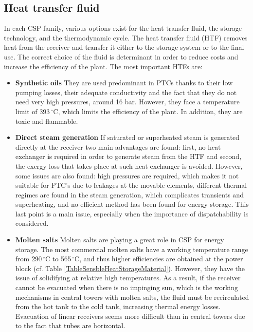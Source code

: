 \subsection{Heat transfer fluid} \label{subsection_HTF}
In each CSP family, various options exist for the heat transfer fluid, the storage technology, and the thermodynamic cycle. The heat transfer fluid (HTF) removes heat from the receiver and transfer it either to the storage system or to the final use. The correct choice of the fluid is determinant in order to reduce costs and increase the efficiency of the plant. The most important HTFs are:
\begin{itemize}
\item \textbf{Synthetic oils} They are used predominant in PTCs thanks to their low pumping losses, their adequate conductivity and the fact that they do not need very high pressures, around 16 bar. However, they face a temperature limit of 393$\,^{\circ}\mathrm{C}$, which limits the efficiency of the plant. In addition, they are toxic and flammable.
\item \textbf{Direct steam generation} If saturated or superheated steam is generated directly at the receiver two main advantages are found: first, no heat exchanger is required in order to generate steam from the HTF and second, the exergy loss that takes place at such heat exchanger is avoided. However, some issues are also found: high pressures are required, which makes it not suitable for PTC's due to leakages at the movable elements, different thermal regimes are found in the steam generation, which complicates transients and superheating, and no efficient method has been found for energy storage. This last point is a main issue, especially when the importance of dispatchability is considered.
\item \textbf{Molten salts} Molten salts are playing a great role in CSP for energy storage. The most commercial molten salts have a working temperature range from 290$\,^{\circ}\mathrm{C}$ to 565$\,^{\circ}\mathrm{C}$, and thus higher efficiencies are obtained at the power block (cf. Table \ref{TableSensbleHeatStorageMaterial}). However, they have the issue of solidifying at relative high temperatures. As a result, if the receiver cannot be evacuated when there is no impinging sun, which is the working mechanisms in central towers with molten salts, the fluid must be recirculated from the hot tank to the cold tank, increasing thermal energy losses. Evacuation of linear receivers seems more difficult than in central towers due to the fact that tubes are horizontal.

\end{itemize}
